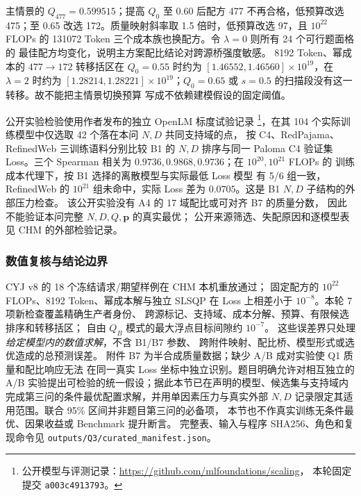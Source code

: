 主情景的 $Q_{477}=0.599515$；提高 $Q_0$ 至 0.60 后配方 477
不再合格，低预算改选 475；至 0.65 改选 172。质量映射斜率取
1.5 倍时，低预算改选 97，且 $10^{22}$ FLOPs 的 131072 Token
三个成本族也换配方。令 $\lambda=0$ 则所有 24 个可行题面格的
最佳配方均变化，说明主方案配比结论对跨源桥强度敏感。
8192 Token、幂成本的 $477\to172$ 转移括区在 $Q_0=0.55$
时约为 $[1.46552,1.46560]\times10^{19}$，在 $\lambda=2$
时约为 $[1.28214,1.28221]\times10^{19}$；$Q_0=0.65$
或 $s=0.5$ 的扫描段没有这一转移。故不能把主情景切换预算
写成不依赖建模假设的固定阈值。

公开实验检验使用作者发布的独立 OpenLM 标度试验记录
\footnote{公开模型与评测记录：\url{https://github.com/mlfoundations/scaling}，
本轮固定提交 \texttt{a003c4913793}。}，在其
104 个实际训练模型中仅选取 42 个落在本问 $N,D$ 共同支持域的点，
按 C4、RedPajama、RefinedWeb 三训练语料分别比较 B1 的
$N,D$ 排序与同一 Paloma C4 验证集 Loss。三个 Spearman 相关为
$0.9736,0.9868,0.9736$；在 $10^{20},10^{21}$ FLOPs 的
训练成本代理下，按 B1 选择的离散模型与实际最低 Loss 模型
有 5/6 组一致，RefinedWeb 的 $10^{21}$ 组未命中，实际 Loss
差为 $0.0705$。这是 B1 $N,D$ 子结构的外部压力检查。
该公开实验没有 A4 的 17 域配比或可对齐 B7 的质量分数，
因此不能验证本问完整 $N,D,Q,\boldsymbol p$ 的真实最优；
公开来源筛选、失配原因和逐模型表见 CHM 的外部检验记录。

\subsubsection{数值复核与结论边界}
CYJ v8 的 18 个冻结请求/期望样例在 CHM 本机重放通过；
固定配方的 $10^{22}$ FLOPs、8192 Token、幂成本解与独立 SLSQP
在 Loss 上相差小于 $10^{-8}$。本轮 7 项新检查覆盖精确生产者身份、
跨源标记、支持域、成本分解、预算、有限候选排序和转移括区；
自由 $Q_B$ 模式的最大浮点目标间隙约 $10^{-7}$。
这些误差界只处理\emph{给定模型内的数值求解}，不含 B1/B7 参数、
跨附件映射、配比桥、模型形式或选优造成的总预测误差。
附件 B7 为半合成质量数据；缺少 A/B 成对实验使 Q1 质量和配比响应无法
在同一真实 Loss 坐标中独立识别。题目明确允许对相互独立的 A/B
实验提出可检验的统一假设；据此本节已在声明的模型、候选集与支持域内
完成第三问的条件最优配置求解，并用单因素压力与真实外部 $N,D$
记录限定其适用范围。联合 95\% 区间并非题目第三问的必备项，
本节也不作真实训练无条件最优、因果收益或 Benchmark 提升断言。
完整表、输入与程序 SHA256、角色和复现命令见
\texttt{outputs/Q3/curated\_manifest.json}。
